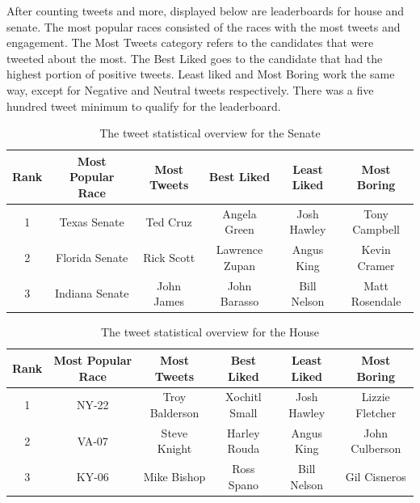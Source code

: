 \documentclass[11pt, twoside, reqno]{book}
\begin{document}
After counting tweets and more, displayed below are leaderboards for house and senate. The most popular races consisted of the races with the most tweets and engagement. The Most Tweets category refers to the candidates that were tweeted about the most. The Best Liked goes to the candidate that had the highest portion of positive tweets. Least liked and Most Boring work the same way, except for Negative and Neutral tweets respectively. There was a five hundred tweet minimum to qualify for the leaderboard. 
\begin{table}[H]
\centering
\begin{tabular}{ |c|c|c|c|c|c|} 
	\hline
	Rank & Most Popular Race & Most Tweets & Best Liked & Least Liked & Most Boring \\
 	\hline 
	1 & Texas Senate & Ted Cruz & Angela Green & Josh Hawley & Tony Campbell\\
  	\hline
	2 & Florida Senate & Rick Scott & Lawrence Zupan & Angus King & Kevin Cramer\\ 
	\hline
	3 & Indiana Senate & John James & John Barasso & Bill Nelson& Matt Rosendale\\
	\hline
\end{tabular}
\caption{The tweet statistical overview for the Senate}\label{fig:senleaderboard}
\end{table}

\begin{table}[H]
\centering
\begin{tabular}{ |c|c|c|c|c|c|} 
	\hline
	Rank & Most Popular Race & Most Tweets & Best Liked & Least Liked & Most Boring \\
 	\hline 
	1 & NY-22 & Troy Balderson & Xochitl Small & Josh Hawley & Lizzie Fletcher\\
  	\hline
	2 & VA-07 & Steve Knight & Harley Rouda & Angus King & John Culberson\\ 
	\hline
	3 & KY-06 & Mike Bishop & Ross Spano & Bill Nelson& Gil Cisneros\\
	\hline
\end{tabular}
\caption{The tweet statistical overview for the House}\label{fig:houseleaderboard}
\end{table}
\end{document}
